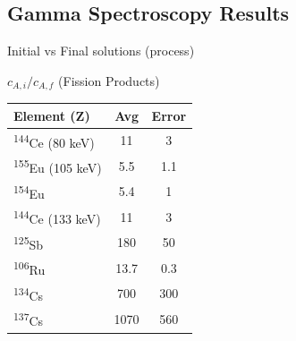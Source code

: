 \documentclass{beamer}
\newcommand{\tss}{\textsuperscript}
\begin{document}
\subsection{Gamma Spectroscopy Results}
\begin{frame}{\small Initial vs Final solutions (process)}
  \vspace{-0.6cm}
  \begin{block}{$c_{A,i}/c_{A,f}$ (Fission Products)}
    \begin{center}
      \vskip -0.2cm
  {\fontsize{7}{11.2}\selectfont
  \begin{tabular}{l  c  c }\toprule
   Element (Z)  & Avg & Error \\ \midrule 
   \tss{144}Ce (80 keV) & 11 & 3  \\
   \tss{155}Eu (105 keV) & 5.5 & 1.1   \\
   \tss{154}Eu & 5.4  & 1  \\
   \tss{144}Ce (133 keV) & 11 & 3  \\
   \tss{125}Sb & 180   & 50   \\
   \tss{106}Ru & 13.7   & 0.3   \\
   \tss{134}Cs & 700  & 300   \\
   \tss{137}Cs & 1070 & 560\\ \bottomrule
  \end{tabular}
  }
  \end{center}
  \end{block}
\end{frame}

\end{document}

